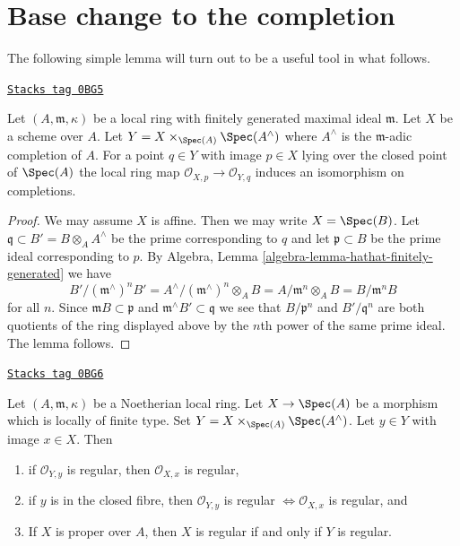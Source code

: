 \section{Base change to the completion}
\label{resolve-section-aux}
The following simple lemma will turn out to be a useful tool in what follows.

\begin{lemma}
\label{resolve-lemma-iso-completions}
\href{https://stacks.math.columbia.edu/tag/0BG5}{\texttt{Stacks tag 0BG5}}

Let $(A, \mathfrak m, \kappa)$ be a local ring with finitely generated
maximal ideal $\mathfrak m$. Let $X$ be a scheme over $A$.
Let $Y = X \times_{\Spec(A)} \Spec(A^\wedge)$ where
$A^\wedge$ is the $\mathfrak m$-adic completion of $A$.
For a point $q \in Y$ with image $p \in X$ lying
over the closed point of $\Spec(A)$ the
local ring map $\mathcal{O}_{X, p} \to \mathcal{O}_{Y, q}$
induces an isomorphism on completions.
\end{lemma}

\begin{proof}
We may assume $X$ is affine. Then we may write $X = \Spec(B)$.
Let $\mathfrak q \subset B' = B \otimes_A A^\wedge$ be the
prime corresponding to $q$ and let $\mathfrak p \subset B$
be the prime ideal corresponding to $p$.
By Algebra, Lemma \ref{algebra-lemma-hathat-finitely-generated}
we have
$$
B'/(\mathfrak m^\wedge)^n B' =
A^\wedge/(\mathfrak m^\wedge)^n \otimes_A B =
A/\mathfrak m^n \otimes_A B = B/\mathfrak m^n B
$$
for all $n$. Since $\mathfrak m B \subset \mathfrak p$ and
$\mathfrak m^\wedge B' \subset \mathfrak q$ we see that
$B/\mathfrak p^n$ and $B'/\mathfrak q^n$ are both
quotients of the ring displayed above by the $n$th power
of the same prime ideal. The lemma follows.
\end{proof}

\begin{lemma}
\label{resolve-lemma-port-regularity-to-completion}
\href{https://stacks.math.columbia.edu/tag/0BG6}{\texttt{Stacks tag 0BG6}}

Let $(A, \mathfrak m, \kappa)$ be a Noetherian local ring.
Let $X \to \Spec(A)$ be a morphism which is locally of finite type.
Set $Y = X \times_{\Spec(A)} \Spec(A^\wedge)$. Let $y \in Y$ with
image $x \in X$. Then
\begin{enumerate}
\item if $\mathcal{O}_{Y, y}$ is regular, then $\mathcal{O}_{X, x}$
is regular,
\item if $y$ is in the closed fibre, then $\mathcal{O}_{Y, y}$ is regular
$\Leftrightarrow \mathcal{O}_{X, x}$ is regular, and
\item If $X$ is proper over $A$, then $X$ is regular
if and only if $Y$ is regular.
\end{enumerate}
\end{lemma}

